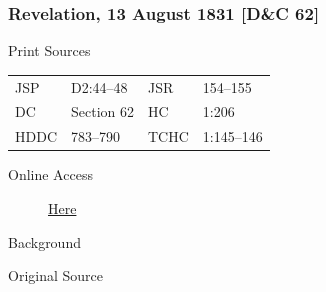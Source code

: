 {		%
		\subsubsection{Revelation, 13 August 1831 [D\&C 62]}
			\label{EMS-1831-JS-13-AUG-1831}
		
			\begin{description}
				\item[Print Sources]
			\end{description}

				\begin{tabular}{p{0.5in}p{1in}p{0.5in}p{1in}}
				JSP	 	& D2:44--48		& JSR 		& 154--155 \\
				DC	 	& Section 62 	& HC 		& 1:206 \\
				HDDC 	& 783--790		& TCHC 		& 1:145--146 \\
				\end{tabular}
			
			\begin{description}
				\item[Online Access] \href{https://www.josephsmithpapers.org/paper-summary/revelation-13-august-1831-dc-62/1}{Here}
			\end{description}
			
			\begin{description}
				\item[Background]
			\end{description}
			
			
			\begin{description}
				\item[Original Source]
			\end{description}
			
			
}
